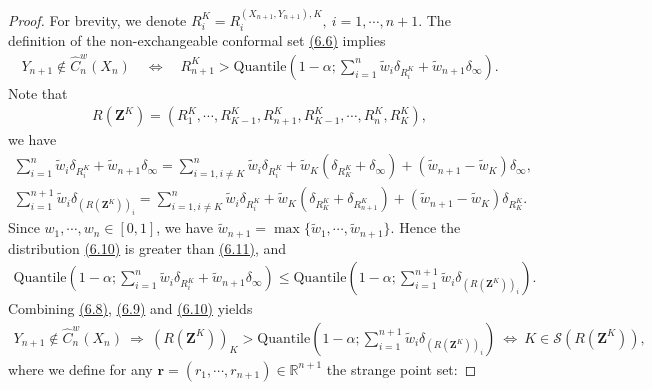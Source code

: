 \documentclass{article}
\numberwithin{equation}{section}
\begin{document}
\begin{proof}
For brevity, we denote $R_i^K = R_i^{(X_{n+1},Y_{n+1}),K},\ i=1,\cdots, n+1.$ The definition of the non-exchangeable conformal set \hyperref[6.6]{(6.6)} implies
\begin{align*}
	Y_{n+1}\notin \widehat{C}_n^w(X_n)\quad\Leftrightarrow\quad R_{n+1}^{K}> \mathrm{Quantile}\left(1-\alpha;\sum_{i=1}^n\widetilde{w}_i\delta_{R_i^K} + \widetilde{w}_{n+1}\delta_\infty\right).\tag{6.8}\label{6.8}
\end{align*}
Note that
\begin{align*}
	R(\mathbf{Z}^K) = \left(R_1^K,\cdots,R_{K-1}^K,R_{n+1}^K,R_{K-1}^K,\cdots,R_n^K,R_K^K\right),\tag{6.9}\label{6.9}
\end{align*}
we have
\begin{align*}
	\sum_{i=1}^n\widetilde{w}_i\delta_{R_i^K} + \widetilde{w}_{n+1}\delta_\infty = \sum_{i=1,i\neq K}^n\widetilde{w}_i\delta_{R_i^K} + \widetilde{w}_K\left(\delta_{R_K^K} + \delta_\infty\right) + \left(\widetilde{w}_{n+1} - \widetilde{w}_K\right)\delta_\infty,\tag{6.10}\label{6.10}\\
	\sum_{i=1}^{n+1}\widetilde{w}_i\delta_{\left(R(\mathbf{Z}^K)\right)_i} = \sum_{i=1,i\neq K}^n\widetilde{w}_i\delta_{R_i^K} + \widetilde{w}_K\left(\delta_{R_K^K} + \delta_{R_{n+1}^K}\right) + \left(\widetilde{w}_{n+1} - \widetilde{w}_K\right)\delta_{R_{K}^K}.\tag{6.11}\label{6.11}
\end{align*}
Since $w_1,\cdots,w_n\in[0,1]$, we have $\widetilde{w}_{n+1}=\max\{\widetilde{w}_1,\cdots,\widetilde{w}_{n+1}\}.$ Hence the distribution \hyperref[6.10]{(6.10)} is greater than \hyperref[6.11]{(6.11)}, and
\begin{align*}
	\mathrm{Quantile}\left(1-\alpha;\sum_{i=1}^n\widetilde{w}_i\delta_{R_i^K} + \widetilde{w}_{n+1}\delta_\infty\right)\leq \mathrm{Quantile}\left(1-\alpha;\sum_{i=1}^{n+1}\widetilde{w}_i\delta_{\left(R(\mathbf{Z}^K)\right)_i}\right).\tag{6.12}
\end{align*}
Combining \hyperref[6.8]{(6.8)}, \hyperref[6.9]{(6.9)} and  \hyperref[6.10]{(6.10)} yields
\begin{align*}
	Y_{n+1}\notin\widehat{C}_n^w(X_n) \ \Rightarrow\  \left(R(\mathbf{Z}^K)\right)_K > \mathrm{Quantile}\left(1-\alpha;\sum_{i=1}^{n+1}\widetilde{w}_i\delta_{\left(R(\mathbf{Z}^K)\right)_i}\right)\ \Leftrightarrow\  K\in\mathcal{S}\left(R(\mathbf{Z}^K)\right),\tag{6.13}\label{6.13}
\end{align*}
where we define for any $\mathbf{r}=(r_1,\cdots,r_{n+1})\in\mathbb{R}^{n+1}$ the strange point set:

\end{proof}
\end{document}
